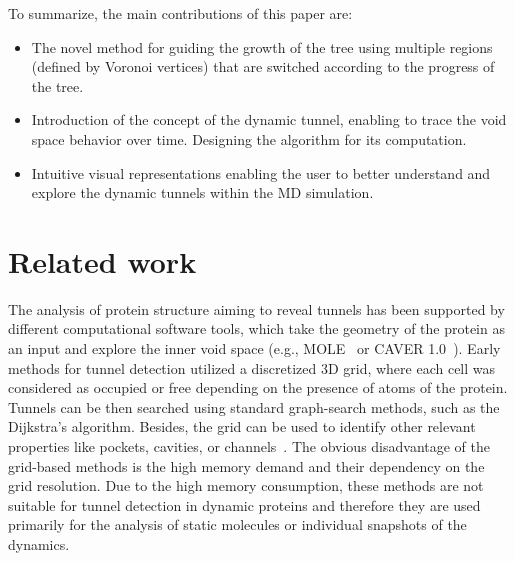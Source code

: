\documentclass[usletter, 10pt, conference]{svjour3}      %
\begin{document}
To summarize, the main contributions of this paper are:
\begin{itemize}
\item The novel method for guiding the growth of the tree using multiple regions (defined by Voronoi vertices) that are switched according to the progress of the tree.
\item Introduction of the concept of the dynamic tunnel, enabling to trace the void space behavior over time. Designing the algorithm for its computation.
\item Intuitive visual representations enabling the user to better understand and explore the dynamic tunnels within the MD simulation.
\end{itemize}
















\section{Related work}



The analysis of protein structure aiming to reveal tunnels has been supported by different computational software tools, which take the geometry of the protein as an input and explore the inner void space (e.g., MOLE~\cite{Petrek20071357} or CAVER 1.0~\cite{petrek2006caver}).
Early methods for tunnel detection utilized a discretized 3D grid, where each cell was considered as occupied or free depending on the presence of atoms of the protein.
Tunnels can be then searched using standard graph-search methods, such as the Dijkstra's algorithm.
Besides, the grid can be used to identify other relevant properties like pockets, cavities, or channels~\cite{sehnal2013mole,petrek2006caver}.
The obvious disadvantage of the grid-based methods is the high memory demand and their dependency on the grid resolution.
Due to the high memory consumption, these methods are not suitable for tunnel detection in dynamic proteins and therefore they are used primarily for the analysis of static molecules or individual snapshots of the dynamics.
\end{document}
